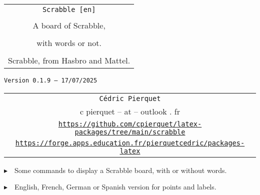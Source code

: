 \documentclass{article}
\def\TPversion{0.1.9}
\def\TPdate{17/07/2025}
\begin{document}
\pagestyle{fancy}

\thispagestyle{empty}

\vspace{2cm}

\begin{center}
	\begin{minipage}{0.75\linewidth}
	\begin{tcolorbox}[colframe=yellow,colback=yellow!15]
		\begin{center}
			\begin{tabular}{c}
				{\Huge \texttt{Scrabble [en]}}\\
				\\
				{\LARGE A board of Scrabble,} \\
				\\
				{\LARGE with words or not.} \\
				\\
				{Scrabble\texttrademark{}, from Hasbro\texttrademark{} and Mattel\texttrademark{}.}
			\end{tabular}
			
			\medskip
			
			{\small \texttt{Version \TPversion{} -- \TPdate}}
		\end{center}
	\end{tcolorbox}
\end{minipage}
\end{center}

\vspace{0.5cm}

\begin{center}
	\begin{tabular}{c}
	\texttt{Cédric Pierquet}\\
	{\ttfamily c pierquet -- at -- outlook . fr}\\
	\texttt{\url{https://github.com/cpierquet/latex-packages/tree/main/scrabble}}\\
	\texttt{\url{https://forge.apps.education.fr/pierquetcedric/packages-latex}}
\end{tabular}
\end{center}

\vspace{0.5cm}

{$\blacktriangleright$~~Some commands to display a Scrabble board, with or without words.}

\smallskip

{$\blacktriangleright$~~English, French, German or Spanish version for points and labels.}
\end{document}
